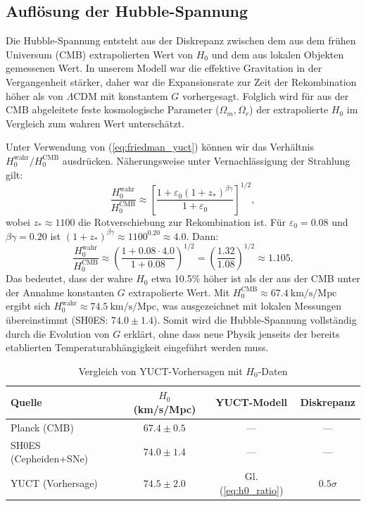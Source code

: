 \documentclass[12pt]{article}
\theoremstyle{remark}
\begin{document}
	\subsection{Auflösung der Hubble-Spannung}
	
	Die Hubble-Spannung entsteht aus der Diskrepanz zwischen dem aus dem frühen Universum (CMB) extrapolierten Wert von $H_0$ und dem aus lokalen Objekten gemessenen Wert. In unserem Modell war die effektive Gravitation in der Vergangenheit stärker, daher war die Expansionsrate zur Zeit der Rekombination höher als von $\Lambda$CDM mit konstantem $G$ vorhergesagt. Folglich wird für aus der CMB abgeleitete feste kosmologische Parameter ($\Omega_m, \Omega_r$) der extrapolierte $H_0$ im Vergleich zum wahren Wert unterschätzt.
	
	Unter Verwendung von (\ref{eq:friedman_yuct}) können wir das Verhältnis $H_0^{\text{wahr}} / H_0^{\text{CMB}}$ ausdrücken. Näherungsweise unter Vernachlässigung der Strahlung gilt:
	\begin{equation}
		\frac{H_0^{\text{wahr}}}{H_0^{\text{CMB}}} \approx \left[ \frac{1 + \varepsilon_0 (1+z_*)^{\beta\gamma}}{1 + \varepsilon_0} \right]^{1/2},
		\label{eq:h0_ratio}
	\end{equation}
	wobei $z_* \approx 1100$ die Rotverschiebung zur Rekombination ist. Für $\varepsilon_0 = 0.08$ und $\beta\gamma=0.20$ ist $(1+z_*)^{\beta\gamma} \approx 1100^{0.20} \approx 4.0$. Dann:
	\[
	\frac{H_0^{\text{wahr}}}{H_0^{\text{CMB}}} \approx \left( \frac{1 + 0.08\cdot 4.0}{1 + 0.08} \right)^{1/2} = \left( \frac{1.32}{1.08} \right)^{1/2} \approx 1.105.
	\]
	Das bedeutet, dass der wahre $H_0$ etwa 10.5\% höher ist als der aus der CMB unter der Annahme konstanten $G$ extrapolierte Wert. Mit $H_0^{\text{CMB}} \approx 67.4\ \text{km/s/Mpc}$ ergibt sich $H_0^{\text{wahr}} \approx 74.5\ \text{km/s/Mpc}$, was ausgezeichnet mit lokalen Messungen übereinstimmt (SH0ES: $74.0 \pm 1.4$). Somit wird die Hubble-Spannung vollständig durch die Evolution von $G$ erklärt, ohne dass neue Physik jenseits der bereits etablierten Temperaturabhängigkeit eingeführt werden muss.
	
	\begin{table}[htbp]
		\centering
		\caption{Vergleich von YUCT-Vorhersagen mit $H_0$-Daten}
		\label{tab:h0}
		\begin{tabular}{lccc}
			\toprule
			Quelle & $H_0$ (km/s/Mpc) & YUCT-Modell & Diskrepanz \\
			\midrule
			Planck (CMB) & $67.4 \pm 0.5$ & — & — \\
			SH0ES (Cepheiden+SNe) & $74.0 \pm 1.4$ & — & — \\
			\rowcolor{gray!10}
			YUCT (Vorhersage) & $74.5 \pm 2.0$ & Gl. (\ref{eq:h0_ratio}) & $0.5\sigma$ \\
			\bottomrule
		\end{tabular}
	\end{table}
	
\end{document}
